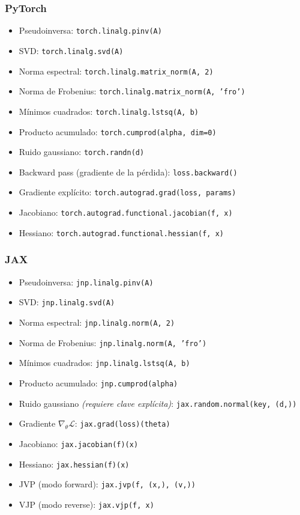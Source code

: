 \subsubsection*{PyTorch}
\begin{itemize}[leftmargin=*, nosep]
  \item Pseudoinversa:
        \texttt{torch.linalg.pinv(A)}
  \item SVD:
        \texttt{torch.linalg.svd(A)}
  \item Norma espectral:
        \texttt{torch.linalg.matrix\_norm(A, 2)}
  \item Norma de Frobenius:
        \texttt{torch.linalg.matrix\_norm(A, 'fro')}
  \item Mínimos cuadrados:
        \texttt{torch.linalg.lstsq(A, b)}
  \item Producto acumulado:
        \texttt{torch.cumprod(alpha, dim=0)}
  \item Ruido gaussiano:
        \texttt{torch.randn(d)}
  \item Backward pass (gradiente de la pérdida):
        \texttt{loss.backward()}
  \item Gradiente explícito:
        \texttt{torch.autograd.grad(loss, params)}
  \item Jacobiano:
        \texttt{torch.autograd.functional.jacobian(f, x)}
  \item Hessiano:
        \texttt{torch.autograd.functional.hessian(f, x)}
\end{itemize}

\subsubsection*{JAX}
\begin{itemize}[leftmargin=*, nosep]
  \item Pseudoinversa:
        \texttt{jnp.linalg.pinv(A)}
  \item SVD:
        \texttt{jnp.linalg.svd(A)}
  \item Norma espectral:
        \texttt{jnp.linalg.norm(A, 2)}
  \item Norma de Frobenius:
        \texttt{jnp.linalg.norm(A, 'fro')}
  \item Mínimos cuadrados:
        \texttt{jnp.linalg.lstsq(A, b)}
  \item Producto acumulado:
        \texttt{jnp.cumprod(alpha)}
  \item Ruido gaussiano \emph{(requiere clave explícita)}:
        \texttt{jax.random.normal(key, (d,))}
  \item Gradiente $\nabla_\theta\mathcal{L}$:
        \texttt{jax.grad(loss)(theta)}
  \item Jacobiano:
        \texttt{jax.jacobian(f)(x)}
  \item Hessiano:
        \texttt{jax.hessian(f)(x)}
  \item JVP (modo forward):
        \texttt{jax.jvp(f, (x,), (v,))}
  \item VJP (modo reverse):
        \texttt{jax.vjp(f, x)}
\end{itemize}

